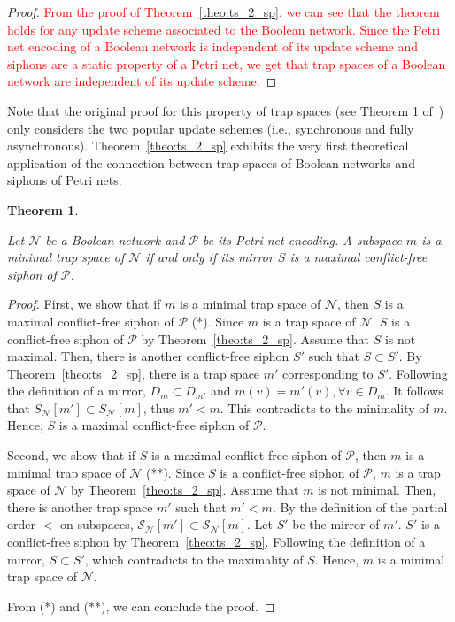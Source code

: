 \documentclass[preprint,12pt]{elsarticle}
\newtheorem{theorem}{Theorem}[section]
\newcommand{\change}[1]{\textcolor{red}{#1}}
\begin{document}
\begin{proof}
\change{From the proof of Theorem~\ref{theo:ts_2_sp}, we can see that the theorem holds for any update scheme associated to the Boolean network.
Since the Petri net encoding of a Boolean network is independent of its update scheme and siphons are a static property of a Petri net, we get that trap spaces of a Boolean network are independent of its update scheme.}
\end{proof}

Note that the original proof for this property of trap spaces (see Theorem 1 of~\cite{klarner2015computing}) only considers the two popular update schemes (i.e., synchronous and fully asynchronous).
Theorem~\ref{theo:ts_2_sp} exhibits the very first theoretical application of the connection between trap spaces of Boolean networks and siphons of Petri nets.

\begin{theorem}%
\label{theo:min_ts_2_max_sp}

  Let \(\mathcal{N}\) be a Boolean network and \(\mathcal{P}\) be its Petri net encoding. A subspace \(m\) is a minimal trap space of \(\mathcal{N}\) if and only if its mirror \(S\) is a maximal conflict-free siphon of \(\mathcal{P}\).

\end{theorem}

\begin{proof}

  First, we show that if \(m\) is a minimal trap space of \(\mathcal{N}\), then \(S\) is a maximal conflict-free siphon of \(\mathcal{P}\) (*).
  Since \(m\) is a trap space of \(\mathcal{N}\), \(S\) is a conflict-free siphon of \(\mathcal{P}\) by Theorem~\ref{theo:ts_2_sp}. Assume that \(S\) is not maximal.
  Then, there is another conflict-free siphon \(S'\) such that \(S \subset S'\).
  By Theorem~\ref{theo:ts_2_sp}, there is a trap space \(m'\) corresponding to \(S'\).
  Following the definition of a mirror, \(D_m \subset D_{m'}\) and \(m(v) = m'(v), \forall v \in D_m\).
  It follows that \(S_{\mathcal{N}}[m'] \subset S_{\mathcal{N}}[m]\), thus \(m' < m\).
  This contradicts to the minimality of \(m\).
  Hence, \(S\) is a maximal conflict-free siphon of \(\mathcal{P}\).

  Second, we show that if \(S\) is a maximal conflict-free siphon of \(\mathcal{P}\), then \(m\) is a minimal trap space of \(\mathcal{N}\) (**).
  Since \(S\) is a conflict-free siphon of \(\mathcal{P}\), \(m\) is a trap space of \(\mathcal{N}\) by Theorem~\ref{theo:ts_2_sp}.
  Assume that \(m\) is not minimal.
  Then, there is another trap space \(m'\) such that \(m' < m\).
  By the definition of the partial order \(<\) on subspaces, \(\mathcal{S}_{\mathcal{N}}[m'] \subset \mathcal{S}_{\mathcal{N}}[m]\). Let \(S'\) be the mirror of \(m'\).
  \(S'\) is a conflict-free siphon by Theorem~\ref{theo:ts_2_sp}.
  Following the definition of a mirror, \(S \subset S'\), which contradicts to the maximality of \(S\).
  Hence, \(m\) is a minimal trap space of \(\mathcal{N}\).

  From (*) and (**), we can conclude the proof.
\end{proof}
\end{document}
